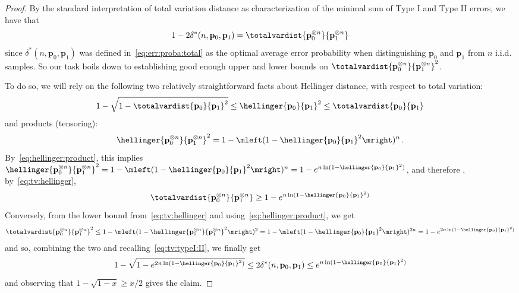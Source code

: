 \documentclass[10pt]{article}
\newcommand{\p}{\mathbf{p}}
\newcommand{\errproba}{\delta}
\newcommand{\ns}{n}
\begin{document}
\begin{proof}
By the standard interpretation of total variation distance as characterization of the minimal sum of Type I and Type II errors, we have that 
 \begin{equation}
  	\label{eq:tv:typeI:II}
	1-2\errproba^\ast(\ns,\p_0,\p_1) = \totalvardist{\p_0^{\otimes n}}{\p_1^{\otimes \ns}}
\end{equation}
since $\errproba^\ast(\ns,\p_0,\p_1)$ was defined in~\eqref{eq:err:proba:total} as the optimal average error probability when distinguishing $\p_0$ and $\p_1$ from $\ns$ i.i.d.\, samples. So our task boils down to establishing good enough upper and lower bounds on $\totalvardist{\p_0^{\otimes n}}{\p_1^{\otimes \ns}}^2$.

 
To do so, we will rely on the following two relatively straightforward facts about Hellinger distance, with respect to total variation:
  \begin{equation}
  	\label{eq:tv:hellinger}
    1-\sqrt{1-\totalvardist{\p_0}{\p_1}^2} \leq \hellinger{\p_0}{\p_1}^2 \leq \totalvardist{\p_0}{\p_1}
  \end{equation}
 and products (tensoring):
\begin{equation}
	\label{eq:hellinger:product}
\hellinger{\p_0^{\otimes \ns}}{\p_1^{\otimes \ns}}^2 = 1 - \mleft(1-\hellinger{\p_0}{\p_1}^2\mright)^{\ns}\,.
\end{equation}
By~\eqref{eq:hellinger:product}, this implies 
$
    \hellinger{\p_0^{\otimes n}}{\p_1^{\otimes \ns}}^2 = 1 - \mleft(1-\hellinger{\p_0}{\p_1}^2\mright)^\ns = 1-e^{\ns\ln(1-\hellinger{\p_0}{\p_1}^2)} 
$, 
and therefore , by~\eqref{eq:tv:hellinger},
\begin{equation}
\totalvardist{\p_0^{\otimes n}}{\p_1^{\otimes \ns}} \geq 1-e^{\ns\ln(1-\hellinger{\p_0}{\p_1}^2)}
\end{equation}
\noindent Conversely, from the lower bound from~\eqref{eq:tv:hellinger} and using~\eqref{eq:hellinger:product}, we get
\begin{align}
	\totalvardist{\p_0^{\otimes n}}{\p_1^{\otimes \ns}}^2 
	\leq 1- \mleft( 1-\hellinger{\p_0^{\otimes \ns}}{\p_1^{\otimes \ns}}^2 \mright)^2
	= 1 - \mleft(1-\hellinger{\p_0}{\p_1}^2\mright)^{2\ns}
	= 1 - e^{2\ns\ln(1-\hellinger{\p_0}{\p_1}^2)}
\end{align}
and so, combining the two and recalling~\eqref{eq:tv:typeI:II}, we finally get
\begin{equation}
1-\sqrt{1-e^{2\ns\ln(1-\hellinger{\p_0}{\p_1}^2)}} \leq 2\errproba^\ast(\ns,\p_0,\p_1) \leq e^{\ns\ln(1-\hellinger{\p_0}{\p_1}^2)}
\end{equation}
and observing that $1-\sqrt{1-x} \geq x/2$ gives the claim.
 \end{proof}
\end{document}
